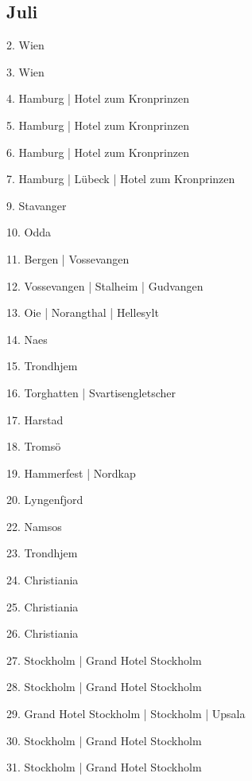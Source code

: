 \documentclass[twoside=false,titlepage=false,open=any, parskip=never, fontsize=10pt, headings=small, chapterprefix=false, appendixprefix=false, DIV=15]{scrbook}
\begin{document}
\begin{multicols}{3}
            \section*{Juli}
            2. Wien\par
            3. Wien\par
            4. Hamburg | Hotel zum Kronprinzen\par
            5. Hamburg | Hotel zum Kronprinzen\par
            6. Hamburg | Hotel zum Kronprinzen\par
            7. Hamburg | Lübeck | Hotel zum Kronprinzen\par
            9. Stavanger\par
            10. Odda\par
            11. Bergen | Vossevangen\par
            12. Vossevangen | Stalheim | Gudvangen\par
            13. Oie | Norangthal | Hellesylt\par
            14. Naes\par
            15. Trondhjem\par
            16. Torghatten | Svartisengletscher\par
            17. Harstad\par
            18. Tromsö\par
            19. Hammerfest | Nordkap\par
            20. Lyngenfjord\par
            22. Namsos\par
            23. Trondhjem\par
            24. Christiania\par
            25. Christiania\par
            26. Christiania\par
            27. Stockholm | Grand Hotel Stockholm\par
            28. Stockholm | Grand Hotel Stockholm\par
            29. Grand Hotel Stockholm | Stockholm | Upsala\par
            30. Stockholm | Grand Hotel Stockholm\par
            31. Stockholm | Grand Hotel Stockholm\par

\end{multicols}
\end{document}
